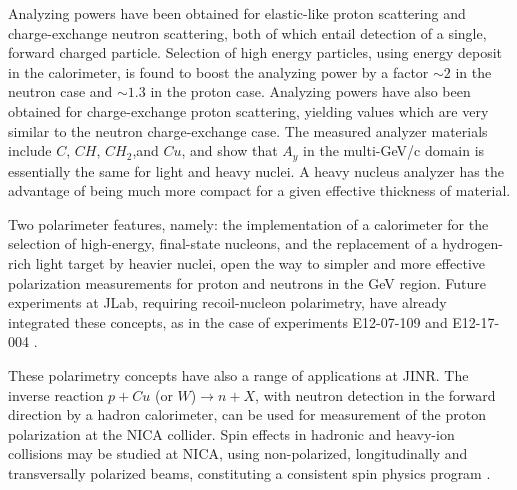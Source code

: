 \documentclass[epj]{svjour}
\begin{document}
Analyzing powers have been obtained for elastic-like proton scattering and charge-exchange neutron scattering, both of which entail detection of a single, forward charged particle. Selection of high energy particles, using energy deposit in the calorimeter, is found to boost the analyzing power by a factor $\sim 2$ in the neutron case and $\sim 1.3$ in the proton case.
Analyzing powers have also been obtained for charge-exchange proton scattering, yielding values which are very similar to the neutron charge-exchange case.
The measured analyzer materials include $C$, $CH$, $CH_2$,and $Cu$, and show that $A_y$ in the multi-GeV/c domain is essentially the same for light and heavy nuclei. A heavy nucleus analyzer has the advantage of being much more compact for a given effective thickness of material.

Two polarimeter features, namely: the implementation of a calorimeter for the selection of high-energy, final-state nucleons,
and the replacement of a hydrogen-rich light target by heavier nuclei, open the way to simpler and more effective polarization measurements  for proton and neutrons in the GeV region.
Future experiments at JLab, requiring recoil-nucleon polarimetry, have already integrated these concepts, as in the case of experiments E12-07-109 \cite{PR12-07-109} and E12-17-004 \cite{PR12-17-004}.

These polarimetry concepts have also a range of applications at JINR. The inverse reaction $p+Cu$ (or $W$)$\to n+X$, with neutron detection in the forward direction by a hadron calorimeter, can be used for measurement of the proton polarization at the NICA collider. Spin effects in hadronic and heavy-ion collisions may be studied at NICA, using non-polarized, longitudinally and transversally polarized beams, constituting a consistent spin physics program \cite{Savin:2016arw}.




\end{document}
